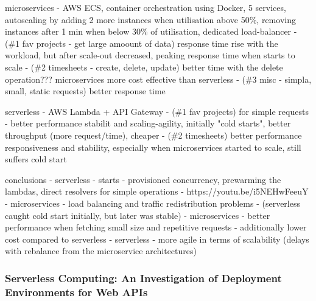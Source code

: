 microservices
- AWS ECS, container orchestration using Docker, 5 services, autoscaling by adding 2 more instances when utilisation above 50\%, removing instances after 1 min when below 30\% of utilisation, dedicated load-balancer
- (\#1 fav projects - get large amoount of data) response time rise with the workload, but after scale-out decreased, peaking response time when starts to scale
- (\#2 timesheets - create, delete, update) better time with the delete operation??? microservices more cost effective than serverless
- (\#3 misc - simpla, small, static requests) better response time

serverless
- AWS Lambda + API Gateway
- (\#1 fav projects) for simple requests - better performance stabilit and scaling-agility, initially "cold starts", better throughput (more request/time), cheaper
- (\#2 timesheets) better performance responsiveness and stability, especially when microservices started to scale, still suffers cold start

conclusions
- serverless - starts - provisioned concurrency, prewarming the lambdas, direct resolvers for simple operations - https://youtu.be/i5NEHwFeeuY
- microservices - load balancing and traffic redistribution problems - (serverless caught cold start initially, but later was stable)
- microservices - better performance when fetching small size and repetitive requests - additionally lower cost compared to serverless
- serverless - more agile in terms of scalability (delays with rebalance from the microservice architectures)

\subsubsection*{Serverless Computing: An Investigation of Deployment Environments for Web APIs}

